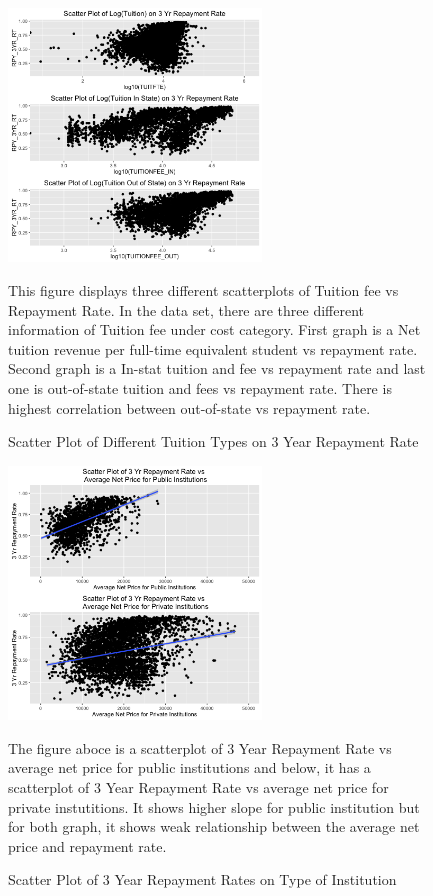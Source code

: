 \begin{figure}
  \caption{Scatter Plot of Different Tuition Types on 3 Year Repayment Rate}
  \centering
  \includegraphics[width=0.6\textwidth]{../images/eda/rpy3yr_tuition_scatter.png}
  \centering
  \newline
  
  \raggedright
This figure displays three different scatterplots of Tuition fee vs Repayment Rate. In the data set, there are three different information of Tuition fee under cost category. First graph is a Net tuition revenue per full-time equivalent student vs repayment rate. Second graph is a In-stat tuition and fee vs repayment rate and last one is out-of-state tuition and fees vs repayment rate. There is highest correlation between out-of-state vs repayment rate.
\end{figure}


\begin{figure}
  \caption{Scatter Plot of 3 Year Repayment Rates on Type of Institution}
  \centering
  \includegraphics[width=0.6\textwidth]{../images/eda/netprice_pub_priv_rpy3yr_scatter}
  \centering
  \newline
  
  \raggedright
The figure aboce is a scatterplot of 3 Year Repayment Rate vs average net price for public institutions and below, it has a scatterplot of 3 Year Repayment Rate vs average net price for private instutitions. It shows higher slope for public institution but for both graph, it shows weak relationship between the average net price and repayment rate. 
\end{figure}


